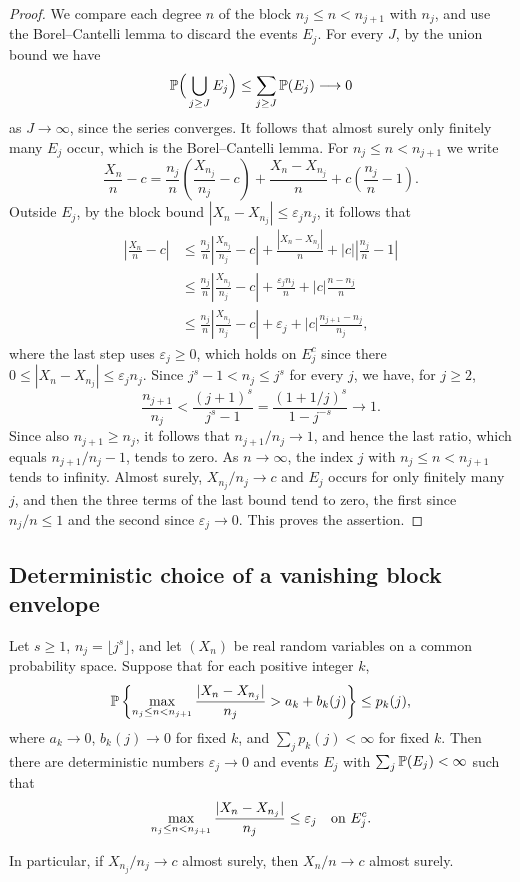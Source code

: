 \begin{proof}
We compare each degree $n$ of the block $n_j\leq n<n_{j+1}$ with $n_j$,
and use the Borel--Cantelli lemma to discard the events $E_j$.
For every $J$, by the union bound we have
\[
 \mathbb P\Big(\bigcup_{j\geq J}E_j\Big)\leq\sum_{j\geq J}\mathbb P(E_j)\longrightarrow0
\]
as $J\to\infty$, since the series converges.
It follows that almost surely only finitely many $E_j$ occur, which is the
Borel--Cantelli lemma.
For $n_j\leq n<n_{j+1}$ we write
\[
 \frac{X_n}{n}-c
 =\frac{n_j}{n}\left(\frac{X_{n_j}}{n_j}-c\right)
   +\frac{X_n-X_{n_j}}n+c\left(\frac{n_j}n-1\right).
\]
Outside $E_j$, by the block bound $|X_n-X_{n_j}|\leq\varepsilon_jn_j$, it
follows that
\begin{align*}
 \left|\frac{X_n}{n}-c\right|
 &\leq\frac{n_j}{n}\left|\frac{X_{n_j}}{n_j}-c\right|
      +\frac{|X_n-X_{n_j}|}n+|c|\left|\frac{n_j}n-1\right|\\
 &\leq\frac{n_j}{n}\left|\frac{X_{n_j}}{n_j}-c\right|
      +\frac{\varepsilon_jn_j}n+|c|\frac{n-n_j}n\\
 &\leq\frac{n_j}{n}\left|\frac{X_{n_j}}{n_j}-c\right|
      +\varepsilon_j+|c|\frac{n_{j+1}-n_j}{n_j},
\end{align*}
where the last step uses $\varepsilon_j\geq0$, which holds on $E_j^c$
since there $0\leq|X_n-X_{n_j}|\leq\varepsilon_jn_j$.
Since $j^s-1<n_j\leq j^s$ for every $j$, we have, for $j\geq2$,
\[
 \frac{n_{j+1}}{n_j}
 <\frac{(j+1)^s}{j^s-1}
 =\frac{(1+1/j)^s}{1-j^{-s}}
 \longrightarrow1.
\]
Since also $n_{j+1}\geq n_j$, it follows that $n_{j+1}/n_j\to1$, and
hence the last ratio, which equals $n_{j+1}/n_j-1$, tends to zero.
As $n\to\infty$, the index $j$ with $n_j\leq n<n_{j+1}$ tends to
infinity. Almost surely, $X_{n_j}/n_j\to c$ and $E_j$ occurs for only
finitely many $j$, and then the three terms of the last bound tend
to zero, the first since $n_j/n\leq1$ and the second since
$\varepsilon_j\to0$.
This proves the assertion.
\end{proof}

\subsection{Deterministic choice of a vanishing block envelope}

\begin{lemma}\label{lem:deterministic-diagonalization}
Let $s\geq1$, $n_j=\lfloor j^s\rfloor$, and let $(X_n)$ be real
random variables on a common probability space.
Suppose that for each positive integer $k$,
\[
 \mathbb P\left\{\max_{n_j\leq n<n_{j+1}}
 \frac{|X_n-X_{n_j}|}{n_j}>a_k+b_k(j)\right\}\leq p_k(j),
\]
where $a_k\to0$, $b_k(j)\to0$ for fixed $k$, and
$\sum_jp_k(j)<\infty$ for fixed $k$.  Then there are deterministic
numbers $\varepsilon_j\to0$ and events $E_j$ with
$\sum_j\mathbb P(E_j)<\infty$ such that
\[
 \max_{n_j\leq n<n_{j+1}}\frac{|X_n-X_{n_j}|}{n_j}\leq\varepsilon_j
 \quad\hbox{on }E_j^c.
\]

In particular, if $X_{n_j}/n_j\to c$ almost surely, then
$X_n/n\to c$ almost surely.
\end{lemma}

